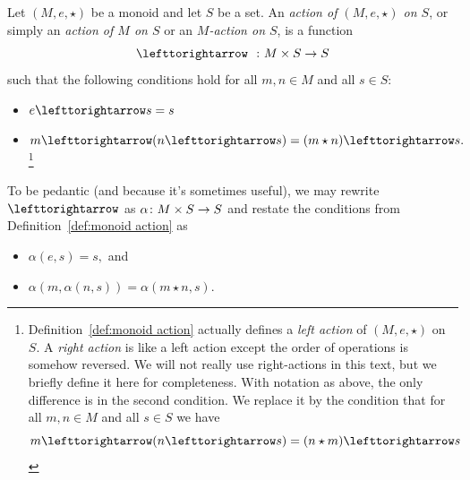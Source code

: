 \documentclass[CT4S-EN-RU]{subfiles}
\begin{document}
\begin{exerciseRUS}\label{exc:classify cyclic}
\end{exerciseRUS}


\subsection{}

\begin{definitionENG}\label{def:monoid action}
Let $(M,e,\star)$ be a monoid and let $S$ be a set. An {\em action of $(M,e,\star)$ on $S$}, or simply an {\em action of $M$ on $S$} or an {\em $M$-action on $S$}, is a function $$\acts\;\;\taking M\times S\to S$$ such that the following conditions hold for all $m,n\in M$ and all $s\in S$:
\begin{itemize}
\item $e\acts s=s$
\item $m\acts(n\acts s)=(m\star n)\acts s.$
\footnote{
Definition~\ref{def:monoid action} actually defines a {\em left action} of $(M,e,\star)$ on $S.$ A {\em right action} is like a left action except the order of operations is somehow reversed. We will not really use right-actions in this text, but we briefly define it here for completeness. With notation as above, the only difference is in the second condition. We replace it by the condition that for all $m,n\in M$ and all $s\in S$ we have
$$m\acts(n\acts s)=(n\star m)\acts s
$$}
\end{itemize}
\end{definitionENG}

\begin{definitionRUS}\label{def:monoid action}
\end{definitionRUS}

\begin{remarkENG}\label{rmk:monoid action}
To be pedantic (and because it's sometimes useful), we may rewrite $\acts$ as $\alpha\colon M\times S\rightarrow S$ and restate the conditions from Definition~\ref{def:monoid action} as
\begin{itemize}
\item $\alpha(e,s)=s,$ and
\item $\alpha(m,\alpha(n,s))=\alpha(m\star n,s).$
\end{itemize}
\end{remarkENG}
\end{document}
